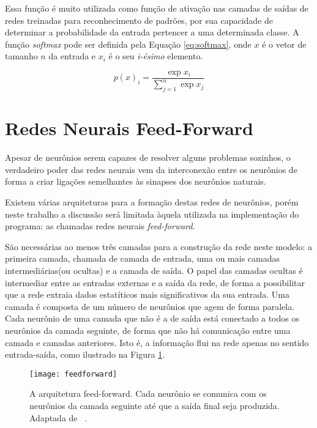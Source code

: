 Essa função é muito utilizada como função de ativação nas camadas de saídas de redes treinadas para reconhecimento de padrões, por sua capacidade de determinar a probabilidade da entrada pertencer a uma determinada classe. A função \textit{softmax} pode ser definida pela Equação \ref{eq:softmax}, onde $x$ é o vetor de tamanho $n$ da entrada e $x_i$ é o seu \textit{i-ésimo} elemento.

\begin{equation}
p(x)_i = \frac{\exp{x_i}}{\sum_{j=1}^n\exp{x_j}}
\label{eq:softmax}
\end{equation}




\section{Redes Neurais Feed-Forward}

Apesar de neurônios serem capazes de resolver alguns problemas sozinhos, o verdadeiro poder das redes neurais vem da interconexão entre os neurônios de forma a criar ligações semelhantes às sinapses dos neurônios naturais.

Existem várias arquiteturas para a formação destas redes de neurônios, porém neste trabalho a discussão será limitada àquela utilizada na implementação do programa: as chamadas redes neurais \textit{feed-forward}.

São necessárias ao menos três camadas para a construção da rede neste modelo: a primeira camada, chamada de camada de entrada, uma ou mais camadas intermediárias(ou ocultas) e a camada de saída. O papel das camadas ocultas é intermediar entre as entradas externas e a saída da rede, de forma a possibilitar que a rede extraia dados estatíticos mais significativos da sua entrada.  Uma camada é composta de um número de neurônios que agem de forma paralela. Cada neurônio de uma camada que não é a de saída está conectado a todos os neurônios da camada seguinte, de forma que não há comunicação entre uma camada e camadas anteriores. Isto é, a informação flui na rede apenas no sentido entrada-saída, como ilustrado na Figura \ref{fig:feedfoward}.

\begin{figure}
\centering
\texttt{[image: feedforward]}
\caption{A arquitetura feed-forward. Cada neurônio se comunica com os neurônios da camada seguinte até que a saída final seja produzida. Adaptada de ~\cite{Haykin}.}
\label{fig:feedfoward}
\centering
\end{figure}

